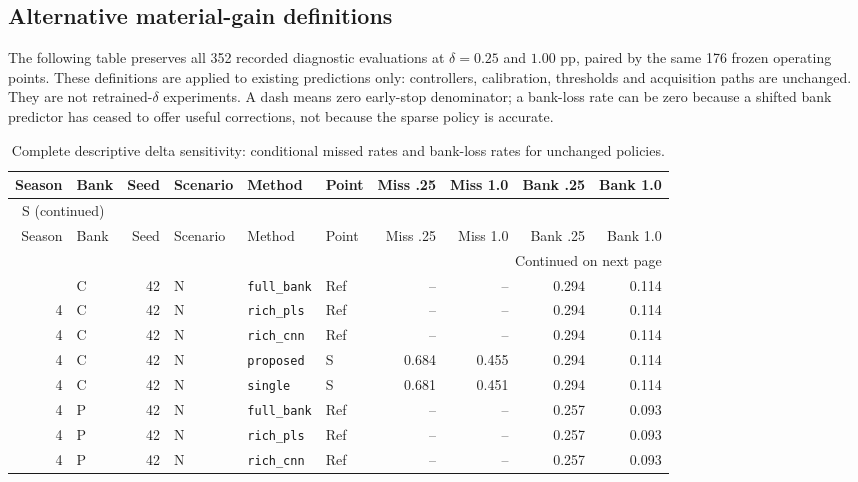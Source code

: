 \documentclass[10pt,a4paper]{article}
\renewcommand{\thetable}{S\arabic{table}}
\begin{document}
\subsection{Alternative material-gain definitions}
The following table preserves all 352 recorded diagnostic evaluations at $\delta=0.25$ and $1.00$ pp, paired by the same 176 frozen operating points. These definitions are applied to existing predictions only: controllers, calibration, thresholds and acquisition paths are unchanged. They are not retrained-$\delta$ experiments. A dash means zero early-stop denominator; a bank-loss rate can be zero because a shifted bank predictor has ceased to offer useful corrections, not because the sparse policy is accurate.

\clearpage
\begin{landscape}
\begingroup\footnotesize
\setlength{\tabcolsep}{3.5pt}
\renewcommand{\arraystretch}{1.10}
\begin{longtable}{rlrlllrrrr}
\caption{Complete descriptive delta sensitivity: conditional missed rates and bank-loss rates for unchanged policies.}\label{tab:delta}\\
\toprule
Season & Bank & Seed & Scenario & Method & Point & Miss .25 & Miss 1.0 & Bank .25 & Bank 1.0 \\
\midrule
\endfirsthead
\multicolumn{10}{l}{\tablename~\thetable{} (continued)}\\
\toprule
Season & Bank & Seed & Scenario & Method & Point & Miss .25 & Miss 1.0 & Bank .25 & Bank 1.0 \\
\midrule
\endhead
\midrule
\multicolumn{10}{r}{Continued on next page}\\
\endfoot
\bottomrule
\endlastfoot
4 & C & 42 & N & \texttt{full\_bank} & Ref & -- & -- & 0.294 & 0.114 \\
4 & C & 42 & N & \texttt{rich\_pls} & Ref & -- & -- & 0.294 & 0.114 \\
4 & C & 42 & N & \texttt{rich\_cnn} & Ref & -- & -- & 0.294 & 0.114 \\
4 & C & 42 & N & \texttt{proposed} & S & 0.684 & 0.455 & 0.294 & 0.114 \\
4 & C & 42 & N & \texttt{single} & S & 0.681 & 0.451 & 0.294 & 0.114 \\
4 & P & 42 & N & \texttt{full\_bank} & Ref & -- & -- & 0.257 & 0.093 \\
4 & P & 42 & N & \texttt{rich\_pls} & Ref & -- & -- & 0.257 & 0.093 \\
4 & P & 42 & N & \texttt{rich\_cnn} & Ref & -- & -- & 0.257 & 0.093 \\

\end{longtable}
\end{landscape}
\end{document}

